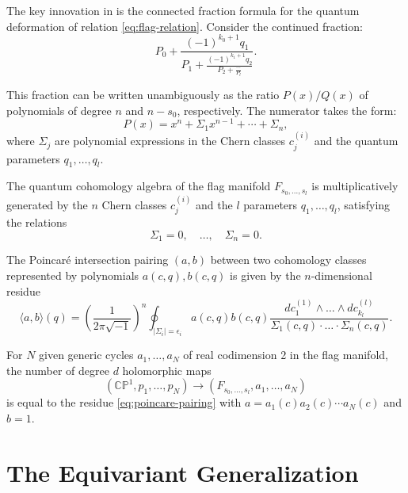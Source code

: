 The key innovation in \cite{Kim1996} is the connected fraction formula for the quantum deformation of relation \cref{eq:flag-relation}. Consider the continued fraction:
\begin{equation}
P_0 + \frac{(-1)^{k_0+1} q_1}{P_1 + \frac{(-1)^{k_1+1} q_2}{P_2 + \frac{\cdots}{P_l}}}.
\label{eq:connected-fraction}
\end{equation}

This fraction can be written unambiguously as the ratio $P(x)/Q(x)$ of polynomials of degree $n$ and $n - s_0$, respectively. The numerator takes the form:
\begin{equation}
P(x) = x^n + \Sigma_1 x^{n-1} + \cdots + \Sigma_n,
\label{eq:numerator-polynomial}
\end{equation}
where $\Sigma_j$ are polynomial expressions in the Chern classes $c_j^{(i)}$ and the quantum parameters $q_1, \ldots, q_l$.

\begin{Theorem}
\label{th:QuantumCohomologyFlag}
The quantum cohomology algebra of the flag manifold $F_{s_0, \ldots, s_l}$ is multiplicatively generated by the $n$ Chern classes $c_j^{(i)}$ and the $l$ parameters $q_1, \ldots, q_l$, satisfying the relations
\[
\Sigma_1 = 0, \quad \ldots, \quad \Sigma_n = 0.
\]

The Poincar\'e intersection pairing $(a, b)$ between two cohomology classes represented by polynomials $a(c, q), b(c, q)$ is given by the $n$-dimensional residue
\begin{equation}
\langle a, b \rangle(q) = \left(\frac{1}{2\pi\sqrt{-1}}\right)^n \oint_{| \Sigma_i | = \epsilon_i} a(c, q) b(c, q) \frac{d c_1^{(1)} \wedge \ldots \wedge d c_{k_l}^{(l)}}{\Sigma_1(c, q) \cdot \ldots \cdot \Sigma_n(c, q)}.
\label{eq:poincare-pairing}
\end{equation}
\end{Theorem}

\begin{Corollary}
\label{cor:EnumerativeCounting}
For $N$ given generic cycles $a_1, \ldots, a_N$ of real codimension 2 in the flag manifold, the number of degree $d$ holomorphic maps
\[
(\mathbb{CP}^1, p_1, \ldots, p_N) \to (F_{s_0, \ldots, s_l}, a_1, \ldots, a_N)
\]
is equal to the residue \cref{eq:poincare-pairing} with $a = a_1(c) a_2(c) \cdots a_N(c)$ and $b = 1$.
\end{Corollary}

\section{The Equivariant Generalization}

